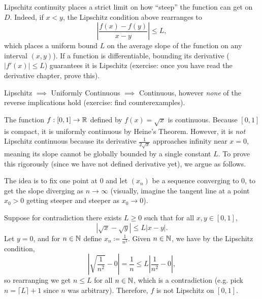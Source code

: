 \documentclass[../analysis1.tex]{subfiles}
\begin{document}
Lipschitz continuity places a strict limit on how ``steep'' the function can get on $D$. Indeed, if $x<y$, the Lipschitz condition above rearranges to \[\left|\frac{f(x)-f(y)}{x-y}\right|\le L,\]
which places a uniform bound $L$ on the average slope of the function on any interval $(x,y)$). If a function is differentiable, bounding its derivative ($|f'(x)| \le L$) guarantees it is Lipschitz (exercise: once you have read the derivative chapter, prove this). 

\begin{remark}
    Lipschitz $\implies$ Uniformly Continuous $\implies$ Continuous, however \textit{none} of the reverse implications hold (exercise: find counterexamples).
\end{remark}

\begin{example}
    The function $f:[0,1]\to\mathbb{R}$ defined by $f(x) = \sqrt{x}$ is continuous. Because $[0,1]$ is compact, it is uniformly continuous by Heine's Theorem. However, it is \textit{not} Lipschitz continuous because its derivative $\frac{1}{2\sqrt{x}}$ approaches infinity near $x=0$, meaning its slope cannot be globally bounded by a single constant $L$. To prove this rigorously (since we have not defined derivative yet), we argue as follows.

    The idea is to fix one point at 0 and let $(x_n)$ be a sequence converging to 0, to get the slope diverging as $n\to\infty$ (visually, imagine the tangent line at a point $x_0>0$ getting steeper and steeper as $x_0\to 0$).

    Suppose for contradiction there exists $L\ge 0$ such that for all $x,y\in [0,1]$,
    \[|\sqrt{x}-\sqrt{y}|\le L|x-y|.\]
    Let $y=0$, and for $n\in\mathbb{N}$ define $x_n\coloneqq\frac{1}{n^2}$. Given $n\in\mathbb{N}$, we have by the Lipschitz condition,
    \[\left|\sqrt{\frac{1}{n^2}}-0\right|=\frac{1}{n}\le L\left|\frac{1}{n^2}-0\right|,\]
    so rearranging we get $n\le L$ for all $n\in\mathbb{N}$, which is a contradiction (e.g. pick $n=\lceil L\rceil +1$ since $n$ was arbitrary). Therefore, $f$ is not Lipschitz on $[0,1]$.
\end{example}
\end{document}
